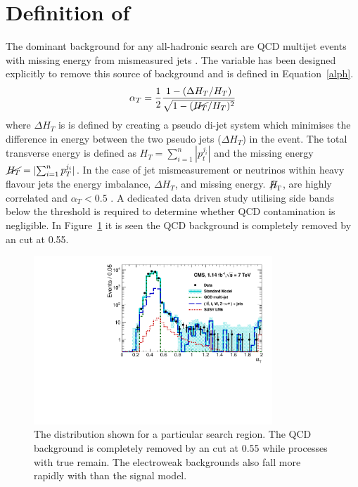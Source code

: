 \section{Definition of \alphat}
The dominant background for any all-hadronic search are QCD multijet events with missing energy from mismeasured jets \cite{randall}. The \alphat variable has been designed explicitly to remove this source of background and is defined in Equation~\ref{alph}.
\begin{equation}
\label{alph}
\alpha_T=\frac{1}{2}\frac{1-(\Delta H_T/H_T)}{\sqrt{1-(\cancel{H_T}/H_T)^2}}
\end{equation}
where $\Delta H_T$ is is defined by creating a pseudo di-jet system which minimises the difference in energy between the two pseudo jets ($\Delta H_T$) in the event. The total transverse energy is defined as $H_T=\sum_{i=1}^n|p_t^{j_i}|$ and the missing energy $\cancel{H_T}=|{\sum_{i=1}^n p_T^{j_i}}|$. In the case of jet mismeasurement or neutrinos within heavy flavour jets the energy imbalance, $\Delta H_T$, and missing energy. $\mht$, are highly correlated and $\alpha_T<0.5$ \cite{CMSAT8}. A dedicated data driven study utilising side bands below the \alphat threshold is required to determine whether QCD contamination is negligible. In Figure~\ref{alphdis} it is seen the QCD background is completely removed by an \alphat cut at 0.55.
\begin{figure}
\centering
    \includegraphics[width=0.8\textwidth]{Figures/sample_aT.pdf}
  \caption{The \alphat distribution shown for a particular search region. The QCD background is completely removed by an \alphat cut at 0.55 while processes with true \met remain. The electroweak backgrounds also fall more rapidly with \alphat than the signal model.}
  \label{alphdis}
\end{figure}

